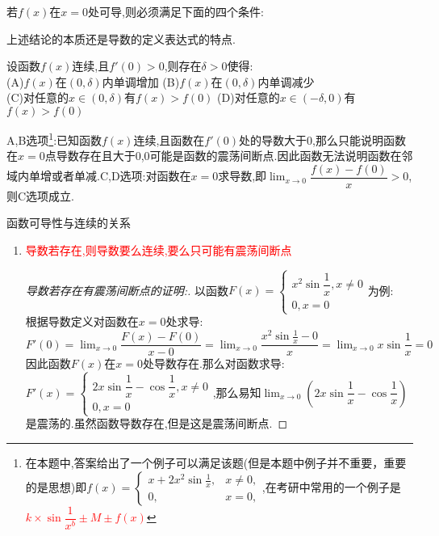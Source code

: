 \documentclass[8pt a4paper, oneside, UTF8]{ctexbook}  %
\begin{document}
\begin{sloppypar}
\begin{conclusion}{若$f(x)$在$x=0$处可导,则必须满足下面的四个条件:}{}
\begin{enumerate}
        \end{enumerate}
        上述结论的本质还是导数的定义表达式的特点.
    \end{conclusion}
    \begin{problem}
        设函数$f(x)$连续,且$f'(0)>0$,则存在$\delta >0 $使得:\\
        (A)$f(x)$在$(0,\delta)$内单调增加 \quad (B)$f(x)$在$(0,\delta)$内单调减少\\
        (C)对任意的$x \in (0,\delta)$有$f(x)>f(0)$ \quad    (D)对任意的$x\in (-\delta,0)$有$f(x)>f(0)$
        \end{problem}
        \begin{solution}
            A,B选项\footnote{在本题中,答案给出了一个例子可以满足该题(但是本题中例子并不重要，重要的是思想)即$\left.f\left(x\right)=\left\{\begin{matrix}x+2x^{2}\sin\frac{1}{x},&x\neq0,\\0,&x=0,\end{matrix}\right.\right.$,在考研中常用的一个例子是\textcolor{red}{$k \times \sin \dfrac{1}{x^b}\pm M \pm f(x)$}}:已知函数$f(x)$连续,且函数在$f'(0)$处的导数大于0,那么只能说明函数在$x=0$点导数存在且大于0,0可能是函数的震荡间断点.因此函数无法说明函数在邻域内单增或者单减.C,D选项:对函数在$x=0$求导数,即$\lim_{x\to 0} \dfrac{f(x)-f(0)}{x}>0$,则C选项成立.
        \end{solution}
    \begin{criterion}{函数可导性与连续的关系}{}
        \begin{enumerate}
            \item \textcolor{red}{导数若存在,则导数要么连续,要么只可能有震荡间断点}
            \begin{proof}[导数若存在有震荡间断点的证明:]
                以函数$F(x)=\begin{cases}
                    x^2 \sin \dfrac{1}{x} ,x \neq 0\\
                    0,x=0
                \end{cases}$为例:
                \\根据导数定义对函数在$x=0$处求导:$F'(0)=\lim_{x\to 0}\dfrac{F(x)-F(0)}{x-0}=\lim_{x\to 0}\dfrac{x^2 \sin \frac1x - 0}{x}=\lim_{x\to 0}x \sin \dfrac{1}{x}=0$因此函数$F(x)$在$x=0$处导数存在.那么对函数求导:\\
                $F'(x)=\begin{cases}
                    2x \sin \dfrac{1}{x} -\cos \dfrac{1}{x} ,x\neq 0\\
                    0 ,x=0
                \end{cases}$,那么易知$\lim_{x\to 0}\left(2 x \sin \dfrac{1}{x} -\cos \dfrac{1}{x} \right)$是震荡的.虽然函数导数存在,但是这是震荡间断点.

\end{proof}
\end{enumerate}
\end{criterion}
\end{sloppypar}
\end{document}

